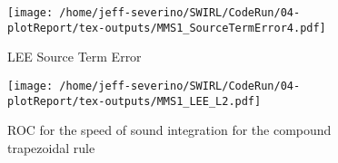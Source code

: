 \begin{figure}[!]
    \centering
    \texttt{[image: /home/jeff-severino/SWIRL/CodeRun/04-plotReport/tex-outputs/MMS1\_SourceTermError4.pdf]}
    \caption{LEE Source Term Error}
    \label{fig:7}
\end{figure}


\begin{figure}[!]
    \centering
    \texttt{[image: /home/jeff-severino/SWIRL/CodeRun/04-plotReport/tex-outputs/MMS1\_LEE\_L2.pdf]}
    \caption{ROC  for the speed of sound integration for the compound trapezoidal rule}
    \label{fig:9}
\end{figure}







